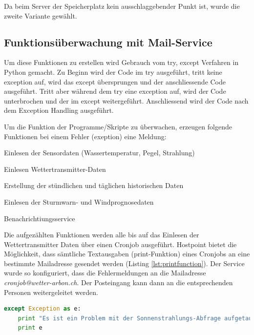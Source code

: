 Da beim Server der Speicherplatz kein ausschlaggebender Punkt ist, wurde die zweite Variante gewählt.



\subsection{Funktionsüberwachung mit Mail-Service}\label{kap:Funktionsüberwachung}
Um diese Funktionen zu erstellen wird Gebrauch vom try, except Verfahren in Python gemacht. Zu Beginn wird der Code im try ausgeführt, tritt keine exception auf, wird das except übersprungen und der anschliessende Code ausgeführt. Tritt aber während dem try eine exception auf, wird der Code unterbrochen und der im except weitergeführt. Anschliessend wird der Code nach dem Exception Handling ausgeführt.\cite{ThePythonTutorial8.ErrorsAndExceptions:Python}

Um die Funktion der Programme/Skripte zu überwachen, erzeugen folgende Funktionen bei einem Fehler (exeption) eine Meldung:

\begin{itemize*}
\item Einlesen der Sensordaten (Wassertemperatur, Pegel, Strahlung)
\item Einlesen Wettertransmitter-Daten
\item Erstellung der stündlichen und täglichen historischen Daten
\item Einlesen der Sturmwarn- und Windprognosedaten
\item Benachrichtiungsservice
\end{itemize*}

Die aufgezählten Funktionen werden alle bis auf das Einlesen der Wettertransmitter Daten über einen Cronjob ausgeführt. Hostpoint bietet die Möglichkeit, dass sämtliche Textausgaben (print-Funktion) eines Cronjobs an eine bestimmte Mailadresse gesendet werden (Listing \ref{lst:printfunction}). Der Service wurde so konfiguriert, dass die Fehlermeldungen an die Mailadresse \emph{cronjob@wetter-arbon.ch}. Der Posteingang kann dann an die entsprechenden Personen weitergeleitet werden.

\begin{lstlisting}[label=lst:printfunction,caption=Beispiel für print Funktion, language=Python, style=py]
except Exception as e:
    print "Es ist ein Problem mit der Sonnenstrahlungs-Abfrage aufgetaucht: "
    print e
\end{lstlisting}

